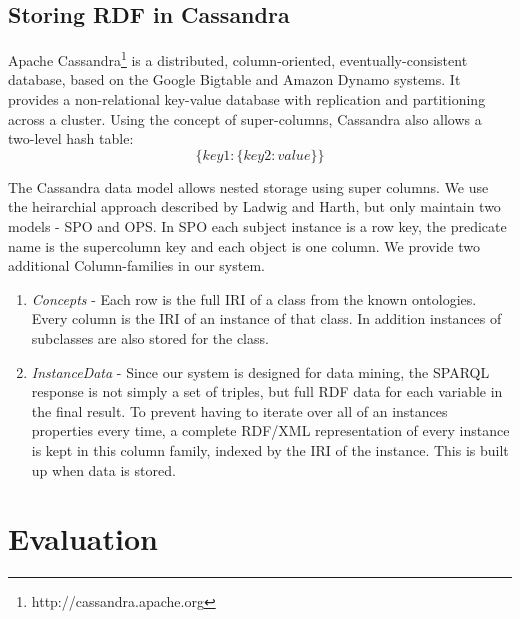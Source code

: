 \documentclass[journal]{IEEEtran}
\begin{document}
\subsection{Storing RDF in Cassandra}

Apache Cassandra\footnote{http://cassandra.apache.org} is a distributed,
column-oriented, eventually-consistent database, based on the Google
Bigtable\cite{Chang06bigtable:a} and Amazon
Dynamo\cite{Hastorun07dynamo} systems. It provides a non-relational
key-value database with replication and partitioning across a cluster. Using
the concept of super-columns, Cassandra also allows a two-level hash table:
$$\{ key1 : \{ key2 : value \} \}$$

The Cassandra data model allows nested storage using super columns. We use the
heirarchial approach described by Ladwig and Harth\cite{ladwig:11}, but only
maintain two models - SPO and OPS. In SPO each subject instance is a row key,
the predicate name is the supercolumn key and each object is one column. We
provide two additional Column-families in our system.

\begin{enumerate}
    \item \emph{Concepts} - Each row is the full IRI of a class from the known
        ontologies. Every column is the IRI of an instance of that class. In
        addition instances of subclasses are also stored for the class.

    \item \emph{InstanceData} - Since our system is designed for data mining,
        the SPARQL response is not simply a set of triples, but full RDF data
        for each variable in the final result. To prevent having to iterate
        over all of an instances properties every time, a complete RDF/XML
        representation of every instance is kept in this column family, indexed
        by the IRI of the instance. This is built up when data is stored.

\end{enumerate}

\section{Evaluation}
\end{document}
